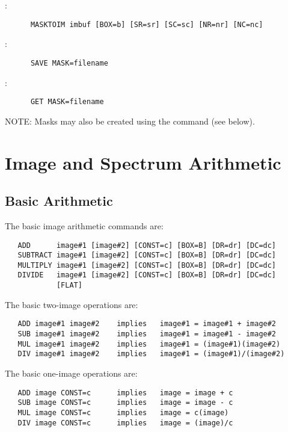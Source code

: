 \noindent {}:
\begin{verbatim}
      MASKTOIM imbuf [BOX=b] [SR=sr] [SC=sc] [NR=nr] [NC=nc]
\end{verbatim}

\noindent {}:
\begin{verbatim}
      SAVE MASK=filename
\end{verbatim}

\noindent {}:
\begin{verbatim}
      GET MASK=filename
\end{verbatim}

\noindent NOTE:  Masks may also be created using the  command
(see below).


\section{Image and Spectrum Arithmetic}

\subsection{Basic Arithmetic}

The basic image arithmetic commands are:
\begin{verbatim}
   ADD      image#1 [image#2] [CONST=c] [BOX=B] [DR=dr] [DC=dc]
   SUBTRACT image#1 [image#2] [CONST=c] [BOX=B] [DR=dr] [DC=dc]
   MULTIPLY image#1 [image#2] [CONST=c] [BOX=B] [DR=dr] [DC=dc]
   DIVIDE   image#1 [image#2] [CONST=c] [BOX=B] [DR=dr] [DC=dc]
		    [FLAT]
\end{verbatim}

\noindent The basic two-image operations are:
\begin{verbatim}
   ADD image#1 image#2    implies   image#1 = image#1 + image#2
   SUB image#1 image#2    implies   image#1 = image#1 - image#2
   MUL image#1 image#2    implies   image#1 = (image#1)(image#2)
   DIV image#1 image#2    implies   image#1 = (image#1)/(image#2)
\end{verbatim}

\noindent The basic one-image operations are:
\begin{verbatim}
   ADD image CONST=c      implies   image = image + c
   SUB image CONST=c      implies   image = image - c
   MUL image CONST=c      implies   image = c(image)
   DIV image CONST=c      implies   image = (image)/c
\end{verbatim}

